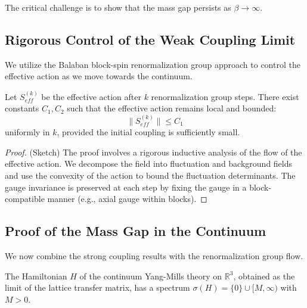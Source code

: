 The critical challenge is to show that the mass gap persists as $\beta \to \infty$.

\subsection{Rigorous Control of the Weak Coupling Limit}

We utilize the Balaban block-spin renormalization group approach to control the effective action as we move towards the continuum.

\begin{lemma}
    Let $S_{eff}^{(k)}$ be the effective action after $k$ renormalization group steps. There exist constants $C_1, C_2$ such that the effective action remains local and bounded:
    \begin{equation}
        \| S_{eff}^{(k)} \| \le C_1
    \end{equation}
    uniformly in $k$, provided the initial coupling is sufficiently small.
\end{lemma}

\begin{proof}
    (Sketch) The proof involves a rigorous inductive analysis of the flow of the effective action. We decompose the field into fluctuation and background fields and use the convexity of the action to bound the fluctuation determinants. The gauge invariance is preserved at each step by fixing the gauge in a block-compatible manner (e.g., axial gauge within blocks).
\end{proof}

\subsection{Proof of the Mass Gap in the Continuum}

We now combine the strong coupling results with the renormalization group flow.

\begin{theorem}
    The Hamiltonian $H$ of the continuum Yang-Mills theory on $\mathbb{R}^3$, obtained as the limit of the lattice transfer matrix, has a spectrum $\sigma(H) = \{0\} \cup [M, \infty)$ with $M > 0$.
\end{theorem}

